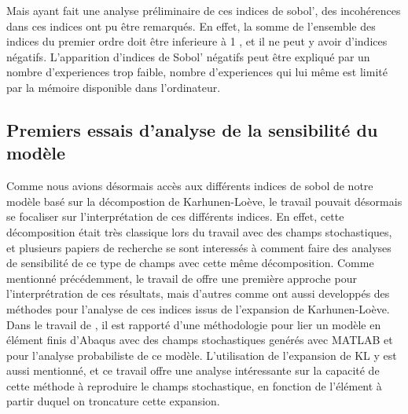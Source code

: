 \documentclass[a4paper,10pt]{article}
\begin{document}
Mais ayant fait une analyse préliminaire de ces indices de sobol', des incohérences dans ces indices ont pu être remarqués. En effet, la somme de l'ensemble des indices du premier ordre doit être inferieure à 1 , et il ne peut y avoir d'indices négatifs. L'apparition d'indices de Sobol' négatifs peut être expliqué par un nombre d'experiences trop faible, nombre d'experiences qui lui même est limité par la mémoire disponible dans l'ordinateur. %



\subsection{Premiers essais d'analyse de la sensibilité du modèle }

Comme nous avions désormais accès aux différents indices de sobol de notre modèle basé sur la décompostion de Karhunen-Loève, le travail pouvait désormais se focaliser sur l'interprétation de ces différents indices. En effet, cette décomposition était très classique lors du travail avec des champs stochastiques, et plusieurs papiers de recherche se sont interessés à comment faire des  analyses de sensibilité de ce type de champs avec cette même décomposition. Comme mentionné précédemment, le travail de \cite{Wei2017May} offre une première approche pour l'interprétration de ces résultats, mais d'autres comme \cite{Pronzato2019Jul} ont aussi developpés des méthodes pour l'analyse de ces indices issus de l'expansion de Karhunen-Loève. 
Dans le travail de \cite{shangStochastic2013}, il est rapporté d'une méthodologie pour lier un modèle en élément finis d'Abaqus avec des champs stochastiques genérés avec MATLAB et pour l'analyse probabiliste de ce modèle. L'utilisation de l'expansion de KL y est aussi mentionné, et ce travail offre une analyse intéressante sur la capacité de cette méthode à reproduire le champs stochastique, en fonction de l'élément à partir duquel on troncature cette expansion. 
\end{document}
